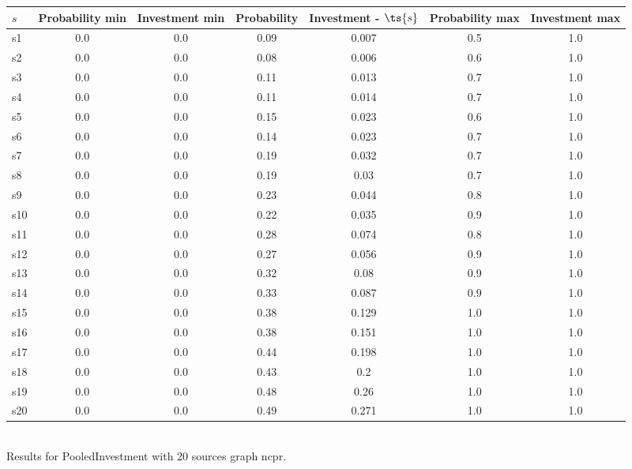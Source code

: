 \documentclass{article}
\begin{document}
\noindent\begin{tabular}{|l|c|c|c|c|c|c|}
\hline
$s$& Probability min & Investment min & Probability & Investment - $\ts{s}$ & Probability max & Investment max\\
\hline
s1 &0.0 & 0.0 & 0.09 & 0.007 & 0.5 & 1.0\\
\hline
s2 &0.0 & 0.0 & 0.08 & 0.006 & 0.6 & 1.0\\
\hline
s3 &0.0 & 0.0 & 0.11 & 0.013 & 0.7 & 1.0\\
\hline
s4 &0.0 & 0.0 & 0.11 & 0.014 & 0.7 & 1.0\\
\hline
s5 &0.0 & 0.0 & 0.15 & 0.023 & 0.6 & 1.0\\
\hline
s6 &0.0 & 0.0 & 0.14 & 0.023 & 0.7 & 1.0\\
\hline
s7 &0.0 & 0.0 & 0.19 & 0.032 & 0.7 & 1.0\\
\hline
s8 &0.0 & 0.0 & 0.19 & 0.03 & 0.7 & 1.0\\
\hline
s9 &0.0 & 0.0 & 0.23 & 0.044 & 0.8 & 1.0\\
\hline
s10 &0.0 & 0.0 & 0.22 & 0.035 & 0.9 & 1.0\\
\hline
s11 &0.0 & 0.0 & 0.28 & 0.074 & 0.8 & 1.0\\
\hline
s12 &0.0 & 0.0 & 0.27 & 0.056 & 0.9 & 1.0\\
\hline
s13 &0.0 & 0.0 & 0.32 & 0.08 & 0.9 & 1.0\\
\hline
s14 &0.0 & 0.0 & 0.33 & 0.087 & 0.9 & 1.0\\
\hline
s15 &0.0 & 0.0 & 0.38 & 0.129 & 1.0 & 1.0\\
\hline
s16 &0.0 & 0.0 & 0.38 & 0.151 & 1.0 & 1.0\\
\hline
s17 &0.0 & 0.0 & 0.44 & 0.198 & 1.0 & 1.0\\
\hline
s18 &0.0 & 0.0 & 0.43 & 0.2 & 1.0 & 1.0\\
\hline
s19 &0.0 & 0.0 & 0.48 & 0.26 & 1.0 & 1.0\\
\hline
s20 &0.0 & 0.0 & 0.49 & 0.271 & 1.0 & 1.0\\
\hline
\end{tabular}\\

\noindent Results for PooledInvestment with 20 sources graph ncpr.
\end{document}
